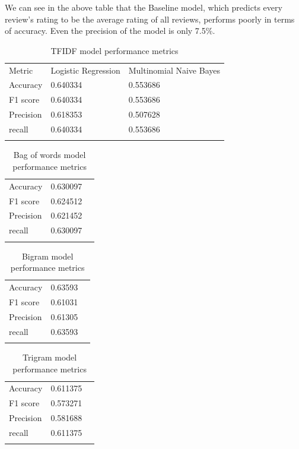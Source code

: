 \documentclass[paper=a4, fontsize=11pt]{scrartcl} %
\numberwithin{equation}{section} %
\numberwithin{figure}{section} %
\numberwithin{table}{section} %
\begin{document}
We can see in the above table that the Baseline model, which predicts every review's rating to be the average rating of all reviews, performs poorly in terms of accuracy. Even the precision of the model is only 7.5\%.

\begin{table}[!htb]
 \centering
 \caption{TFIDF model performance metrics}
 \label{tfidf_performance}
 \begin{tabular}{l l l} 
    \noalign{\smallskip}\hline\noalign{\smallskip}
    Metric & Logistic Regression & Multinomial Naive Bayes\\
    \noalign{\smallskip}\hline\noalign{\smallskip}
    Accuracy & 0.640334	& 0.553686\\
    F1 score & 0.640334	& 0.553686\\
    Precision & 0.618353 & 0.507628\\
    recall & 0.640334 & 0.553686\\
    \noalign{\smallskip}\hline
  \end{tabular} 
\end{table}  

\begin{table}[!htb]
 \centering
 \caption{Bag of words model performance metrics}
 \label{bow_performance}
 \begin{tabular}{l l l} 
    \noalign{\smallskip}\hline\noalign{\smallskip}
    Accuracy & 0.630097\\
    F1 score & 0.624512\\
    Precision & 0.621452\\
    recall & 0.630097\\
    \noalign{\smallskip}\hline
  \end{tabular} 
\end{table}  

\begin{table}[!htb]
 \centering
 \caption{Bigram model performance metrics}
 \label{bigram_performance}
 \begin{tabular}{l l l} 
    \noalign{\smallskip}\hline\noalign{\smallskip}
    Accuracy & 0.63593\\
    F1 score & 0.61031\\
    Precision & 0.61305\\
    recall & 0.63593\\
    \noalign{\smallskip}\hline
  \end{tabular} 
\end{table}  

\begin{table}[!htb]
 \centering
 \caption{Trigram model performance metrics}
 \label{trigram_performance}
 \begin{tabular}{l l l} 
    \noalign{\smallskip}\hline\noalign{\smallskip}
    Accuracy & 0.611375\\
    F1 score & 0.573271\\
    Precision & 0.581688\\
    recall & 0.611375\\
    \noalign{\smallskip}\hline
  \end{tabular} 
\end{table}  
\end{document}
